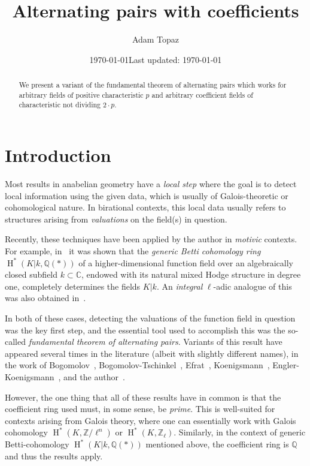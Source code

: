 \documentclass[12pt]{amsart}
\title{Alternating pairs with coefficients}
\author{Adam Topaz}
\date{\today}
\date{Last updated: \today}
\newcommand{\HH}{\operatorname{H}}
\newcommand{\Qbb}{\mathbb{Q}}
\newcommand{\Cbb}{\mathbb{C}}
\newcommand{\Zbb}{\mathbb{Z}}
\begin{document}
\maketitle

\begin{abstract}
  We present a variant of the fundamental theorem of alternating pairs which works for arbitrary fields of positive characteristic $p$ and arbitrary coefficient fields of characteristic not dividing $2 \cdot p$.
\end{abstract}

\tableofcontents

\section{Introduction}

Most results in anabelian geometry have a \emph{local step} where the goal is to detect local information using the given data, which is usually of Galois-theoretic or cohomological nature.
In birational contexts, this local data usually refers to structures arising from \emph{valuations} on the field(s) in question.

Recently, these techniques have been applied by the author in \emph{motivic} contexts.
For example, in~\cite{https://doi.org/10.48550/arxiv.1705.01084} it was shown that the \emph{generic Betti cohomology ring} $\HH^{*}(K|k,\Qbb(*))$ of a higher-dimensional function field over an algebraically closed subfield $k \subset \Cbb$, endowed with its natural mixed Hodge structure in degree one, completely determines the fields $K|k$.
An \emph{integral} $\ell$-adic analogue of this was also obtained in~\cite{https://doi.org/10.48550/arxiv.1910.03563}.

In both of these cases, detecting the valuations of the function field in question was the key first step, and the essential tool used to accomplish this was the so-called \emph{fundamental theorem of alternating pairs}.
Variants of this result have appeared several times in the literature (albeit with slightly different names), in the work of Bogomolov~\cite{zbMATH00124400}, Bogomolov-Tschinkel~\cite{zbMATH02078165}, Efrat~\cite{zbMATH01489500}, Koenigsmann~\cite{zbMATH00785379}, Engler-Koenigsmann~\cite{zbMATH01135369}, and the author~\cite{zbMATH06778776,https://doi.org/10.48550/arxiv.1705.01084}.

However, the one thing that all of these results have in common is that the coefficient ring used must, in some sense, be \emph{prime}.
This is well-suited for contexts arising from Galois theory, where one can essentially work with Galois cohomology $\HH^{*}(K,\Zbb/\ell^{n})$ or $\HH^{*}(K,\Zbb_{\ell})$.
Similarly, in the context of generic Betti-cohomology $\HH^{*}(K|k,\Qbb(*))$ mentioned above, the coefficient ring is $\Qbb$ and thus the results apply.
\end{document}
